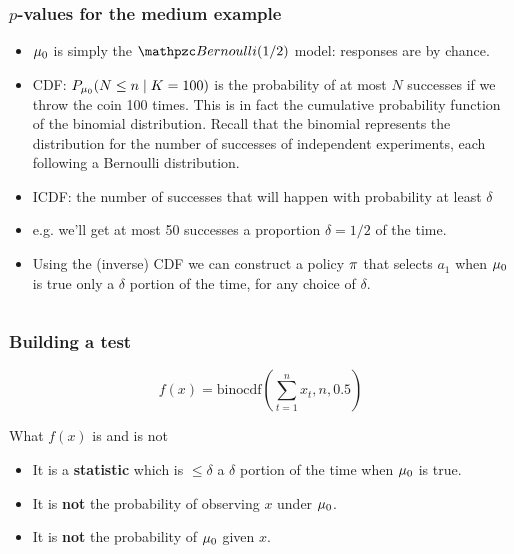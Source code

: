 \begin{frame}\frametitle{$p$-values for the medium example}
  \begin{itemize}
  \item<2->$\mu_0$ is simply the $\Bernoulli(1/2)$ model:
    responses are by chance. 
  \item<3->CDF: $P_{\mu_0}(N \leq n \mid K = 100)$  {is the probability of at most $N$ successes if we throw the coin 100 times. This is in fact the cumulative probability function of the binomial distribution. Recall that the binomial represents the distribution for the number of successes of independent experiments, each following a Bernoulli distribution.}
  \item<4->ICDF:  the number of successes that will happen with probability at least $\delta$
  \item<5->e.g. we'll get at most 50 successes a proportion $\delta = 1/2$ of the time.
  \item<6>Using the (inverse) CDF we can construct a policy $\pi$ that selects $a_1$ when $\mu_0$ is true only a $\delta$ portion of the time, for any choice of $\delta$.
  \end{itemize}
  \begin{columns}
    \setlength{}
    \setlength{}
    \begin{column}{0.5\textwidth}
    \end{column}
    \begin{column}{0.5\textwidth}
    \end{column}
  \end{columns}    
\end{frame}



\begin{frame}
  \frametitle{Building a test}
  \[
    f(x) = \textrm{binocdf}(\sum_{t=1}^n x_t, n, 0.5)
  \]
  \begin{alertblock}{What $f(x)$ is and is not}
    \begin{itemize}
    \item It is a \textbf{statistic} which is $\leq \delta$ a $\delta$ portion of the time when $\mu_0$ is true.
    \item It is \textbf{not} the probability of observing $x$ under $\mu_0$.
    \item It is \textbf{not} the probability of $\mu_0$ given $x$.
    \end{itemize}
  \end{alertblock}
\end{frame}


